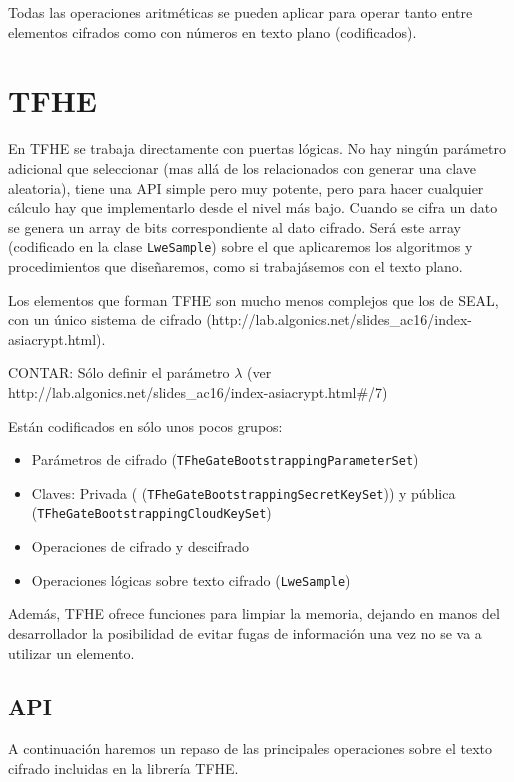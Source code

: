 Todas las operaciones aritméticas se pueden aplicar para operar tanto entre elementos cifrados como con números en texto plano (codificados).

\section{TFHE}

En TFHE se trabaja directamente con puertas lógicas. No hay ningún parámetro adicional que seleccionar (mas allá de los relacionados con generar una clave aleatoria), tiene una API simple pero muy potente, pero para hacer cualquier cálculo hay que implementarlo desde el nivel más bajo. Cuando se cifra un dato se genera un array de bits correspondiente al dato cifrado. Será este array (codificado en la clase \verb|LweSample|) sobre el que aplicaremos los algoritmos y procedimientos que diseñaremos, como si trabajásemos con el texto plano.

Los elementos que forman TFHE son mucho menos complejos que los de SEAL, con un único sistema de cifrado (http://lab.algonics.net/slides_ac16/index-asiacrypt.html).

CONTAR: Sólo definir el parámetro $\lambda$ (ver http://lab.algonics.net/slides_ac16/index-asiacrypt.html#/7)

Están codificados en sólo unos pocos grupos:

\begin{itemize}
  \item Parámetros de cifrado (\texttt{TFheGateBootstrappingParameterSet})
  \item Claves: Privada ( (\texttt{TFheGateBootstrappingSecretKeySet})) y pública (\texttt{TFheGateBootstrappingCloudKeySet})
  \item Operaciones de cifrado y descifrado
  \item Operaciones lógicas sobre texto cifrado (\texttt{LweSample})
\end{itemize}

Además, TFHE ofrece funciones para limpiar la memoria, dejando en manos del desarrollador la posibilidad de evitar fugas de información una vez no se va a utilizar un elemento.

\subsection{API}

A continuación haremos un repaso de las principales operaciones sobre el texto cifrado incluidas en la librería TFHE.

